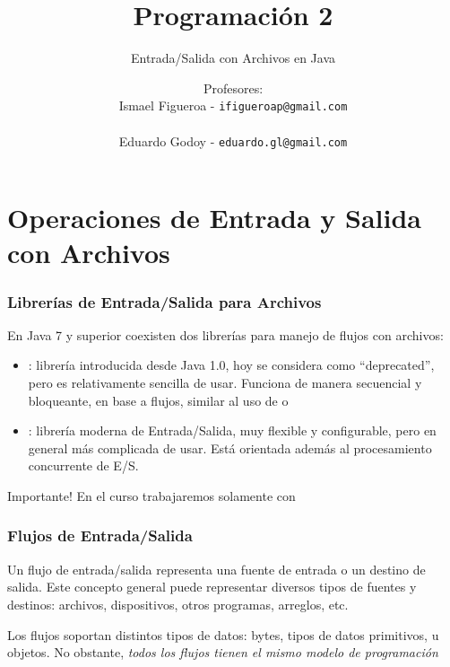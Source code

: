 \documentclass{beamer}
\title[\textbf{Programación 2}]{\textbf{Programación 2}}
\subtitle{Entrada/Salida con Archivos en Java}
\author[IF-EG]
{Profesores:\\
  Ismael Figueroa -  \texttt{\small ifigueroap@gmail.com} \\
  \vspace{0.5mm} \\
  Eduardo Godoy - \texttt{\small eduardo.gl@gmail.com}
}
\institute[Universidad de Valparaíso]
\date{}
\begin{document}
\begin{frame}
  \titlepage
\end{frame}

\section{Operaciones de Entrada y Salida con Archivos}

\begin{frame}
  \frametitle{Librerías de Entrada/Salida para Archivos}

  En Java 7 y superior coexisten dos librerías para manejo de flujos
  con archivos:

  \begin{itemize}
  \item {}: librería introducida desde Java 1.0, hoy se
    considera como ``deprecated'', pero es relativamente sencilla de
    usar. Funciona de manera secuencial y bloqueante, en base a
    flujos, similar al uso de  o 
    
  \item {}: librería moderna de Entrada/Salida, muy
    flexible y configurable, pero en general más complicada de
    usar. Está orientada además al procesamiento concurrente de E/S.
    
  \end{itemize}

  \begin{alertblock}{Importante!}
      En el curso trabajaremos solamente con 
  \end{alertblock}
  
\end{frame}

\begin{frame}
  \frametitle{Flujos de Entrada/Salida}

  \begin{block}{}
    Un flujo de entrada/salida representa una fuente de entrada o un
    destino de salida. Este concepto general puede representar
    diversos tipos de fuentes y destinos: archivos, dispositivos,
    otros programas, arreglos, etc.    
  \end{block}

  \begin{block}{}
    Los flujos soportan distintos tipos de datos: bytes, tipos de
    datos primitivos, u objetos. No obstante, \emph{todos los flujos
      tienen el mismo modelo de programación}
  \end{block}
\end{frame}
\end{document}
